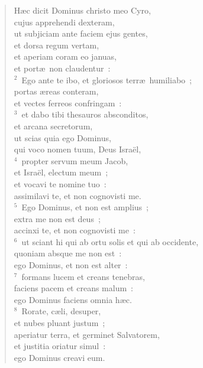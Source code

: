 \begin{flushleft}\begin{verse}\vspace{-19pt}\hspace{6pt}H\ae c dicit Dominus christo meo Cyro,\\\hspace{6pt} cujus apprehendi dexteram,\\ ut subjiciam ante faciem ejus gentes,\\ et dorsa regum vertam,\\ et aperiam coram eo januas,\\ et port\ae\ non claudentur~:\\
${}^{2}$~Ego ante te ibo, et gloriosos terr\ae\ humiliabo~;\\ portas \ae reas conteram,\\ et vectes ferreos confringam~:\\
${}^{3}$~et dabo tibi thesauros absconditos,\\ et arcana secretorum,\\ ut scias quia ego Dominus,\\ qui voco nomen tuum, Deus Isra\"el,\\
${}^{4}$~propter servum meum Jacob,\\ et Isra\"el, electum meum~;\\ et vocavi te nomine tuo~:\\ assimilavi te, et non cognovisti me.\\
${}^{5}$~Ego Dominus, et non est amplius~;\\ extra me non est deus~;\\ accinxi te, et non cognovisti me~:\\
${}^{6}$~ut sciant hi qui ab ortu solis et qui ab occidente,\\ quoniam absque me non est~:\\ ego Dominus, et non est alter~:\\
${}^{7}$~formans lucem et creans tenebras,\\ faciens pacem et creans malum~:\\ ego Dominus faciens omnia h\ae c.\\
${}^{8}$~Rorate, c\ae li, desuper,\\ et nubes pluant justum~;\\ aperiatur terra, et germinet Salvatorem,\\ et justitia oriatur simul~:\\ ego Dominus creavi eum.\end{verse}\end{flushleft}


